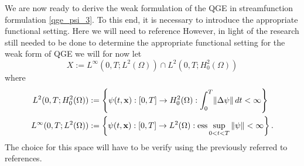 We are now ready to derive the weak formulation of the QGE in streamfunction formulation
\eqref{qge_psi_3}. To this end, it is necessary to introduce the appropriate functional setting.
Here we will need to reference \cite{Braess,
Ciarlet,Cascon,GunzburgerApprox,GunzburgerMethods,Gunzburger89,Layton08,Girault79,Girault79,Medjo99}
However, in light of the research still needed to be done to determine the appropriate functional
setting for the weak form of QGE we will for now let
\begin{equation*}
  X := L^{\infty}(0,T; L^2(\Omega)) \cap L^2(0,T;H^2_0(\Omega)) 
\end{equation*}
where 
\begin{align*}
  L^2(0,T;H^2_0(\Omega)) &:= \left\{ \psi(t,\mathbf{x}):[0,T] \to H^2_0(\Omega):
    \int_{0}^{T}\! \|\Delta \psi\| \,dt < \infty \right\} \\
  L^{\infty}(0,T;L^2(\Omega)) &:= \left\{ \psi(t,\mathbf{x}):[0,T] \to L^2(\Omega):
    \operatorname{ess} \sup_{0<t<T} \|\psi\| < \infty\right\}.
\end{align*}
The choice for this space will have to be verify using the previously referred to references.

